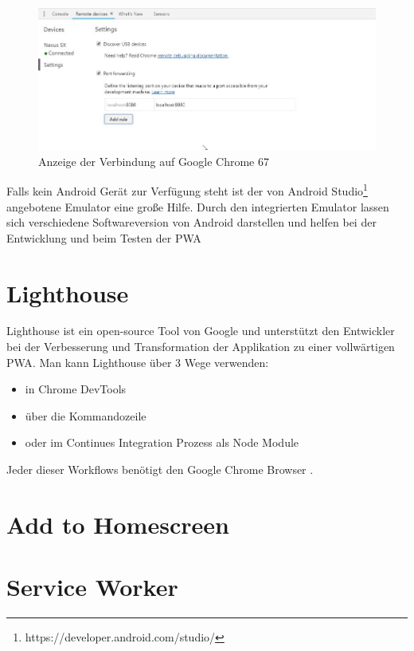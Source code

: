\begin{figure}[h]
	\centering
	\includegraphics[width=14cm]{BilderAllgemein/DevToolsChrome}\medskip
	\caption{Anzeige der Verbindung auf Google Chrome 67}
	\label{fig:DevToolsChrome}
\end{figure}

Falls kein Android Gerät zur Verfügung steht ist der von Android Studio\footnote{https://developer.android.com/studio/} angebotene Emulator eine große Hilfe. Durch den integrierten Emulator lassen sich verschiedene Softwareversion von Android darstellen und helfen bei der Entwicklung und beim Testen der \acs{PWA}

\section{Lighthouse}
Lighthouse ist ein open-source Tool von Google und unterstützt den Entwickler bei der Verbesserung und Transformation der Applikation zu einer vollwärtigen \acs{PWA}. Man kann Lighthouse über 3 Wege verwenden:
\begin{itemize}
    \item  in Chrome DevTools
	\item  über die Kommandozeile
	\item  oder im Continues Integration Prozess als Node Module
\end{itemize}
Jeder dieser Workflows benötigt den Google Chrome Browser \cite{Lighthouse}.



\section{Add to Homescreen}


\section{Service Worker}



